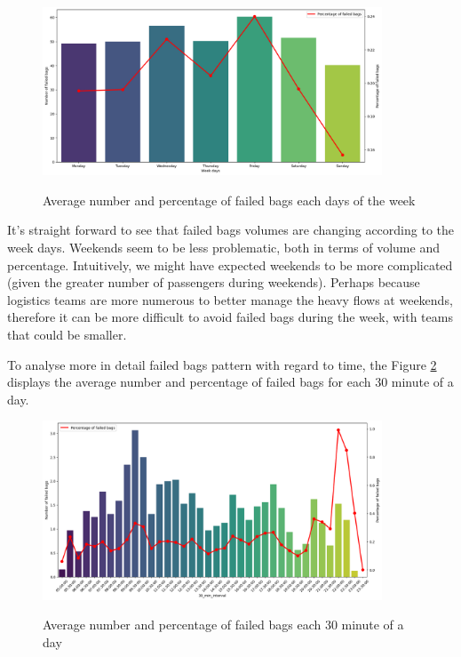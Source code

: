 \documentclass[12pt]{article}
\begin{document}
\begin{figure}[h]
    \centering
    \includegraphics[width=0.9\textwidth]{Number and percentage of failed bags within a week.png}\\
    \caption{Average number and percentage of failed bags each days of the week}
    \label{fig:Average number and percentage of failed bags each days of the week}
\end{figure}
\FloatBarrier

It's straight forward to see that failed bags volumes are changing according to the week days. Weekends seem to be less problematic, both in terms of volume and percentage. Intuitively, we might have expected weekends to be more complicated (given the greater number of passengers during weekends). Perhaps because logistics teams are more numerous to better manage the heavy flows at weekends, therefore it can be more difficult to avoid failed bags during the week, with teams that could be smaller.

To analyse more in detail failed bags pattern with regard to time, the Figure \ref{fig:Average number and percentage of failed bags each 30 minute of a day} displays the average number and percentage of failed bags for each 30 minute of a day.

\begin{figure}[h]
    \centering
    \includegraphics[width=0.9\textwidth]{Number and percentage of failed bags within a day.png}\\
    \caption{Average number and percentage of failed bags each 30 minute of a day}
    \label{fig:Average number and percentage of failed bags each 30 minute of a day}
\end{figure}
\FloatBarrier
\end{document}
